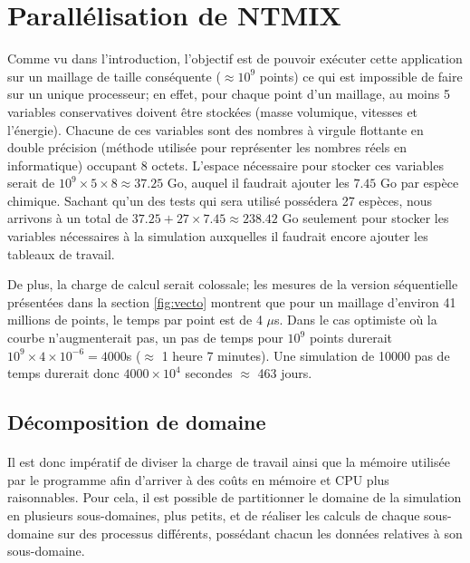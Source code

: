 \section{Parallélisation de NTMIX} \label{sec:part2}


Comme vu dans l'introduction, l'objectif est de pouvoir exécuter cette application sur un maillage de taille conséquente ($\approx 10^9$ points) ce qui est impossible de faire sur un unique processeur; en effet, pour chaque point d'un maillage, au moins 5 variables conservatives doivent être stockées (masse volumique, vitesses et l'énergie). Chacune de ces variables sont des nombres à virgule flottante en double précision (méthode utilisée pour représenter les nombres réels en informatique) occupant 8 octets. L'espace nécessaire pour stocker ces variables serait de $10^9 \times 5 \times 8 \approx 37.25$ Go, auquel il faudrait ajouter les $7.45$ Go par espèce chimique. Sachant qu'un des tests qui sera utilisé possédera 27 espèces, nous arrivons à un total de $37.25+27 \times 7.45\approx 238.42$ Go seulement pour stocker les variables nécessaires à la simulation auxquelles il faudrait encore ajouter les tableaux de travail.

De plus, la charge de calcul serait colossale; les mesures de la version séquentielle présentées dans la section \ref{fig:vecto} montrent que pour un maillage d'environ 41 millions de points, le temps par point est de 4 $\mu$s. Dans le cas optimiste où la courbe n'augmenterait pas, un pas de temps pour $10^9$ points durerait $10^9\times4\times10^{-6}=4000$s ($\approx$ 1 heure 7 minutes). Une simulation de 10000 pas de temps durerait donc $4000\times10^4$ secondes $\approx$ 463 jours.


\subsection{Décomposition de domaine}
\paragraph{}Il est donc impératif de diviser la charge de travail ainsi que la mémoire utilisée par le programme afin d'arriver à des coûts en mémoire et CPU plus raisonnables. Pour cela, il est possible de partitionner le domaine de la simulation en plusieurs sous-domaines, plus petits, et de réaliser les calculs de chaque sous-domaine sur des processus différents, possédant chacun les données relatives à son sous-domaine. 

